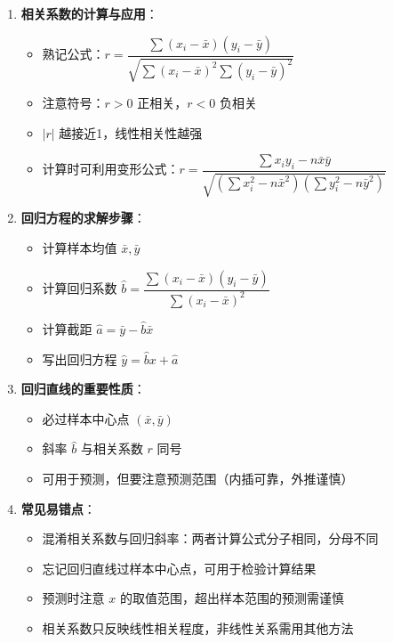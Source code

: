 \documentclass[11pt]{ctexrep}
\begin{document}
\begin{enumerate}
    \item \textbf{相关系数的计算与应用}：
    \begin{itemize}
        \item 熟记公式：$r = \dfrac{\sum(x_i - \bar{x})(y_i - \bar{y})}{\sqrt{\sum(x_i - \bar{x})^2 \sum(y_i - \bar{y})^2}}$
        \item 注意符号：$r > 0$ 正相关，$r < 0$ 负相关
        \item $|r|$ 越接近1，线性相关性越强
        \item 计算时可利用变形公式：$r = \dfrac{\sum x_i y_i - n\bar{x}\bar{y}}{\sqrt{(\sum x_i^2 - n\bar{x}^2)(\sum y_i^2 - n\bar{y}^2)}}$
    \end{itemize}
    
    \item \textbf{回归方程的求解步骤}：
    \begin{itemize}
        \item 计算样本均值 $\bar{x}, \bar{y}$
        \item 计算回归系数 $\hat{b} = \dfrac{\sum(x_i - \bar{x})(y_i - \bar{y})}{\sum(x_i - \bar{x})^2}$
        \item 计算截距 $\hat{a} = \bar{y} - \hat{b}\bar{x}$
        \item 写出回归方程 $\hat{y} = \hat{b}x + \hat{a}$
    \end{itemize}
    
    \item \textbf{回归直线的重要性质}：
    \begin{itemize}
        \item 必过样本中心点 $(\bar{x}, \bar{y})$
        \item 斜率 $\hat{b}$ 与相关系数 $r$ 同号
        \item 可用于预测，但要注意预测范围（内插可靠，外推谨慎）
    \end{itemize}
    
    \item \textbf{常见易错点}：
    \begin{itemize}
        \item 混淆相关系数与回归斜率：两者计算公式分子相同，分母不同
        \item 忘记回归直线过样本中心点，可用于检验计算结果
        \item 预测时注意 $x$ 的取值范围，超出样本范围的预测需谨慎
        \item 相关系数只反映线性相关程度，非线性关系需用其他方法
    \end{itemize}
\end{enumerate}
\end{document}

